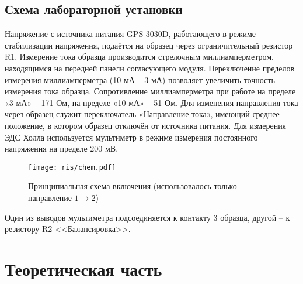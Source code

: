 \documentclass[a4paper,14pt]{extarticle}
\begin{document}
\subsection{Схема лабораторной установки}
Напряжение с источника питания GPS-3030D, работающего в режиме стабилизации напряжения, подаётся на образец через ограничительный резистор R1. Измерение тока образца производится стрелочным миллиамперметром, находящимся на передней панели согласующего модуля. Переключение пределов измерения миллиамперметра (10 мА – 3 мА) позволяет увеличить точность измерения тока образца. Сопротивление миллиамперметра при работе на пределе «3 мА» – 171 Ом, на пределе «10 мА» – 51 Ом. Для изменения направления тока через образец служит переключатель «Направление тока», имеющий среднее положение, в котором образец отключён от источника питания.
Для измерения ЭДС Холла используется мультиметр в режиме измерения постоянного напряжения на пределе 200 мВ. 
\begin{figure}[h!]
	\centering
	\texttt{[image: ris/chem.pdf]}
	\caption{Принципиальная схема включения (использовалось только направление $1\to2$)}
	\label{fig:figure2}
\end{figure}
Один из выводов мультиметра подсоединяется к контакту 3 образца, другой – к резистору R2 <<Балансировка>>.

\section{Теоретическая часть}



\end{document}
